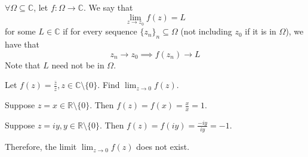 \documentclass[notoc,notitlepage]{tufte-book}
\begin{document}
\begin{defn}\label{defn:Convergence for Complex Functions}
	$\forall \Omega \subseteq \mathbb{C}$, let $f: \Omega \to \mathbb{C}$. We say that
	\begin{equation}
		\lim_{z \to z_0} f(z) = L
	\end{equation}
	for some $L \in \mathbb{C}$ if for every sequence $\{z_n\}_n \subseteq \Omega$ (not including $z_0$ if it is in $\Omega$), we have that
	\begin{equation}
		z_n \to z_0 \implies f(z_n) \to L
	\end{equation}
	Note that $L$ need not be in $\Omega$.
\end{defn}

\begin{eg}\label{eg:limit dne}
	Let $f(z) = \frac{\bar{z}}{z}, z \in \mathbb{C} \setminus \{0\}$. Find $\lim_{z \to 0} f(z)$.

	\begin{solution}
		Suppose $z = x \in \mathbb{R} \setminus \{0\}$. Then $f(z) = f(x) = \frac{x}{x} = 1$.

		Suppose $z = iy, y \in \mathbb{R} \setminus \{0\}$. Then $f(z) = f(iy) = \frac{-iy}{iy} = -1$.

		Therefore, the limit $\lim_{z \to 0} f(z)$ does not exist.
	\end{solution}
\end{eg}
\end{document}
